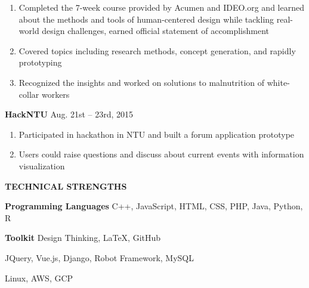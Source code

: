 \documentclass[12pt]{article}
\begin{document}
	\begin{enumerate}

		\item Completed the 7-week course provided by Acumen and IDEO.org and learned about the methods and tools of human-centered design while tackling real-world design challenges, earned official statement of accomplishment

		\item Covered topics including research methods, concept generation, and rapidly prototyping

		\item Recognized the insights and worked on solutions to malnutrition of white-collar workers

	\end{enumerate}

	\vspace{0.5em}

	\textbf{HackNTU} \hfill Aug. 21st -- 23rd, 2015

	\begin{enumerate}

		\item Participated in hackathon in NTU and built a forum application prototype

		\item Users could raise questions and discuss about current events with information visualization

	\end{enumerate}

	\vspace{1em}

\textbf{\large{\uppercase{Technical Strengths}}}
\hrulefill{}

	\vspace{0.5em}

	\textbf{Programming Languages} \hfill C++, JavaScript, HTML, CSS, PHP, Java, Python, R

	\vspace{0.5em}

	\textbf{Toolkit} \hfill Design Thinking, LaTeX, GitHub

	\hfill JQuery, Vue.js, Django, Robot Framework, MySQL

	\hfill Linux, AWS, GCP
\end{document}
